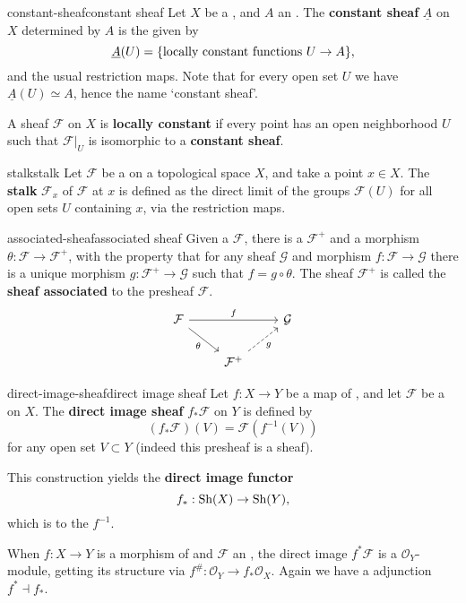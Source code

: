 \begin{topic}{constant-sheaf}{constant sheaf}
    Let $X$ be a , and $A$ an . The \textbf{constant sheaf} $\underline{A}$ on $X$ determined by $A$ is the  given by
    \[ \underline{A}(U) = \{ \textup{locally constant functions } U \to A \} , \]
    and the usual restriction maps. Note that for every  open set $U$ we have $\underline{A}(U) \simeq A$, hence the name `constant sheaf'.
    
    A sheaf $\mathcal{F}$ on $X$ is \textbf{locally constant} if every point has an open neighborhood $U$ such that $\mathcal{F}|_U$ is isomorphic to a \textbf{constant sheaf}.
\end{topic}

\begin{topic}{stalk}{stalk}
    Let $\mathcal{F}$ be a  on a topological space $X$, and take a point $x \in X$. The \textbf{stalk} $\mathcal{F}_x$ of $\mathcal{F}$ at $x$ is defined as the direct limit of the groups $\mathcal{F}(U)$ for all open sets $U$ containing $x$, via the restriction maps.
\end{topic}

\begin{topic}{associated-sheaf}{associated sheaf}
    Given a  $\mathcal{F}$, there is a  $\mathcal{F}^+$ and a morphism $\theta : \mathcal{F} \to \mathcal{F}^+$, with the property that for any sheaf $\mathcal{G}$ and morphism $f : \mathcal{F} \to \mathcal{G}$ there is a unique morphism $g : \mathcal{F}^+ \to \mathcal{G}$ such that $f = g \circ \theta$. The sheaf $\mathcal{F}^+$ is called the \textbf{sheaf associated} to the presheaf $\mathcal{F}$.
    \[ \begin{tikzcd} \mathcal{F} \arrow{rr}{f} \arrow[swap]{dr}{\theta} && \mathcal{G} \\ & \mathcal{F}^+ \arrow[swap,dashed]{ur}{g} & \end{tikzcd} \]
\end{topic}

\begin{topic}{direct-image-sheaf}{direct image sheaf}
    Let $f : X \to Y$ be a map of , and let $\mathcal{F}$ be a  on $X$. The \textbf{direct image sheaf} $f_* \mathcal{F}$ on $Y$ is defined by
    \[ (f_* \mathcal{F})(V) = \mathcal{F}(f^{-1}(V)) \]
    for any open set $V \subset Y$ (indeed this presheaf is a sheaf).
    
    This construction yields the \textbf{direct image functor}
    \[ f_* : \textup{Sh}(X) \to \textup{Sh}(Y) , \]
    which is  to the  $f^{-1}$.
    
    When $f : X \to Y$ is a morphism of  and $\mathcal{F}$ an , the direct image $f^* \mathcal{F}$ is a $\mathcal{O}_Y$-module, getting its structure via $f^\# : \mathcal{O}_Y \to f_* \mathcal{O}_X$. Again we have a adjunction $f^* \dashv f_*$.
\end{topic}

